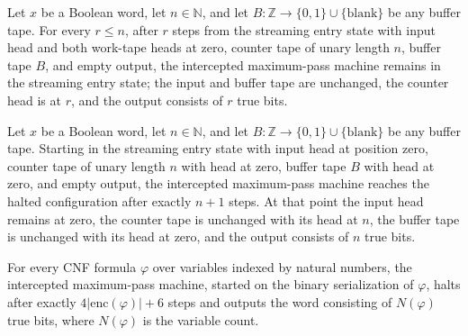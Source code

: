 \begin{lemma}
\label{Complexity.satMax_prefix}
\leanok
{}
Let $x$ be a Boolean word, let $n\in\mathbb{N}$, and let
$B:\mathbb{Z}\to\{0,1\}\cup\{\text{blank}\}$ be any buffer tape. For every $r\le n$,
after $r$ steps from the streaming entry state with input head and both work-tape heads
at zero, counter tape of unary length $n$, buffer tape $B$, and empty output, the
intercepted maximum-pass machine remains in the streaming entry state; the input and
buffer tape are unchanged, the counter head is at $r$, and the output consists of $r$
true bits.
\end{lemma}

\begin{lemma}
\label{Complexity.satMax_finish}
\leanok
{}
Let $x$ be a Boolean word, let $n\in\mathbb{N}$, and let
$B:\mathbb{Z}\to\{0,1\}\cup\{\text{blank}\}$ be any buffer tape. Starting in the
streaming entry state with input head at position zero, counter tape of unary length $n$
with head at zero, buffer tape $B$ with head at zero, and empty output, the intercepted
maximum-pass machine reaches the halted configuration after exactly $n+1$ steps. At that
point the input head remains at zero, the counter tape is unchanged with its head at
$n$, the buffer tape is unchanged with its head at zero, and the output consists of $n$
true bits.
\end{lemma}

\begin{lemma}
\label{Complexity.satMax_computes}
\leanok
{}
For every CNF formula $\varphi$ over variables indexed by natural numbers, the
intercepted maximum-pass machine, started on the binary serialization of $\varphi$,
halts after exactly $4|\mathrm{enc}(\varphi)|+6$ steps and outputs the word consisting
of $N(\varphi)$ true bits, where $N(\varphi)$ is the variable count.
\end{lemma}

